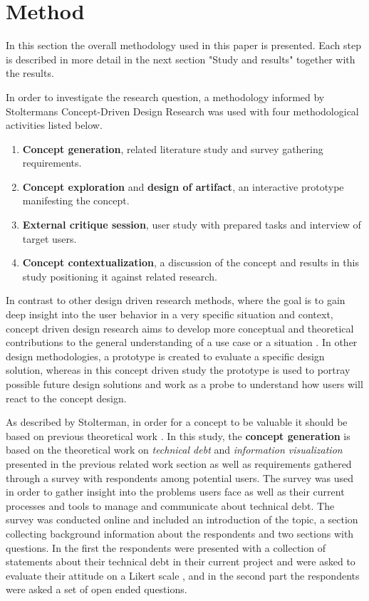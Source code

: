 

\section{Method}
In this section the overall methodology used in this paper is presented. Each step is described in more detail in the next section "Study and results" together with the results.

In order to investigate the research question, a methodology informed by Stoltermans Concept-Driven Design Research \cite{stolterman_concept-driven_2010} was used with four methodological activities listed below.

\smallskip
\begin{enumerate}
  \item \textbf{Concept generation}, related literature study and survey gathering requirements.
  \item \textbf{Concept exploration}  and \textbf{design of artifact}, an interactive prototype manifesting the concept.
  \item \textbf{External critique session}, user study with prepared tasks and interview of target users.
  \item \textbf{Concept contextualization}, a discussion of the concept and results in this study positioning it against related research.
\end{enumerate}
\smallskip

In contrast to other design driven research methods, where the goal is to gain deep insight into the user behavior in a very specific situation and context, concept driven design research aims to develop more conceptual and theoretical contributions to the general understanding of a use case or a situation \cite{stolterman_concept-driven_2010}.
In other design methodologies, a prototype is created to evaluate a specific design solution, whereas in this concept driven study the prototype is used to portray possible future design solutions and work as a probe to understand how users will react to the concept design.

As described by Stolterman, in order for a concept to be valuable it should be based on previous theoretical work \cite{stolterman_concept-driven_2010}.
In this study, the \textbf{concept generation} is based on the theoretical work on \textit{technical debt} and \textit{information visualization} presented in the previous related work section as well as requirements gathered through a survey with respondents among potential users.
The survey was used in order to gather insight into the problems users face as well as their current processes and tools to manage and communicate about technical debt. 
The survey was conducted online and included an introduction of the topic, a section collecting background information about the respondents and two sections with questions.
In the first the respondents were presented with a collection of statements about their technical debt in their current project and were asked to evaluate their attitude on a Likert scale \cite{wilson_questionnaires_2013}, and in the second part the respondents were asked a set of open ended questions.

